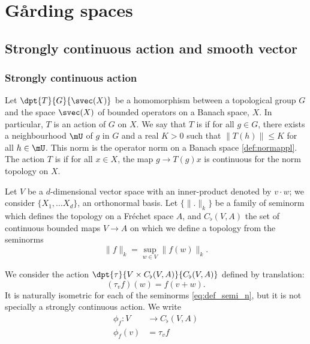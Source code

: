 
%
   \section{G\r arding spaces}
%

\subsection{Strongly continuous action and smooth vector}  \label{subsec:actionrn}

\subsubsection{Strongly continuous action}

Let $\dpt{T}{G}{\svec(X)}$ be a homomorphism between a topological group $G$ and the space $\svec(X)$ of bounded operators on a Banach space, $X$. In particular, $T$ is an action of $G$ on $X$. We say that $T$ is  if for all $g\in G$, there exists a neighbourhood $\mU$ of $g$ in $G$ and a real $K>0$ such that $\| T(h) \|\leq K$ for all $h\in\mU$. This norm is the operator norm on a Banach space \ref{def:normappl}. The action $T$ is  if for all $x\in X$, the map $g\to T(g)x$ is continuous for the norm topology on $X$.

Let $V$ be a $d$-dimensional vector space with an inner-product denoted by $v\cdot w$; we consider $\{ X_1,\ldots X_d \}$, an orthonormal basis. Let $\{\| . \|_k\}$ be a family of seminorm which defines the topology on a Fréchet space $A$, and $C_{\flat}(V,A)$  the set of continuous bounded maps $V\to A$ on which we define a topology from the seminorms
\begin{equation} \label{eq:def_semi_n}
  \| f \|_k=\sup_{w\in V}\| f(w) \|_k.
\end{equation}

We consider the action $\dpt{\tau}{V\times C_{\flat}(V,A)}{C_{\flat}(V,A)}$ defined by translation:
\begin{equation} \label{eq:def_act_tau}
(\tau_vf)(w)=f(v+w).
\end{equation}
It is naturally isometric for each of the seminorms \eqref{eq:def_semi_n}, but it is not specially a strongly continuous action. We write 
\begin{equation}
	\begin{aligned}
		\phi_f\colon V&\to C_{\flat}(V,A) \\
		\phi_f(v)&=\tau_vf 
	\end{aligned}
\end{equation}

